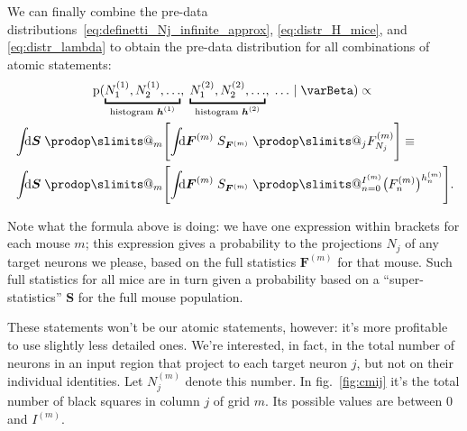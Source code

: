 \documentclass[\ifafour a4paper,12pt,\else a5paper,10pt,\fi%
onecolumn,oneside,article,%
british%
]{memoir}
\makeatletter
\theoremstyle{remark}
\theoremstyle{innote}
\def\prod{\DOTSI\prodop\slimits@}
\newcommand*{\di}{\mathrm{d}}%
\newcommand*{\pf}{\mathrm{p}}%
\renewcommand*{\|}[1][]{\nonscript\,#1\vert\nonscript\;\mathopen{}}
\newcommand*{\fig}{fig.}%
\newcommand*{\yI}{\varBeta}
\newcommand*{\yF}{\bm{F}}
\newcommand*{\yFm}[1][m]{\yF^{(#1)}}
\newcommand*{\yFFm}[1][m]{F^{(#1)}}
\newcommand*{\yh}{\bm{h}}
\newcommand*{\yhm}[1][m]{\yh^{(#1)}}
\newcommand*{\yIm}[1][m]{I^{(#1)}}
\newcommand*{\yNm}[1][m]{N^{(#1)}}
\newcommand*{\ySS}{S}
\newcommand*{\yS}{\bm{\ySS}}
\makeatother
\begin{document}
We can finally combine the pre-data
distributions~\eqref{eq:definetti_Nj_infinite_approx},
\eqref{eq:distr_H_mice}, and \eqref{eq:distr_lambda} to obtain the pre-data
distribution for all combinations of  atomic statements:
\begin{multline}
  \label{eq:pre-data_final}
  \pf(\underbracket{\yNm[1]_{1},\yNm[1]_{2},\dotsc}_{\text{histogram $\yhm[1]$}},\;
  \underbracket{\yNm[2]_{1},\yNm[2]_{2},\dotsc}_{\text{histogram $\yhm[2]$}},\;
  \dotsc   \| \yI)
  \propto{}\\
  \begin{aligned}
  &\int\!\!\!\di\yS\;\prod_{m}\Biggl[\int\!\!\!\di\yFm\;
  \ySS_{\yFm} \;
  \prod_{j} \yFFm_{N_{j}}
  \Biggr]
\equiv{}\\
  &\int\!\!\!\di\yS\;\prod_{m}\Biggl[\int\!\!\!\di\yFm\;
  \ySS_{\yFm} \;
  \prod_{n=0}^{\yIm} \bigl(\yFFm_{n}\bigr)^{h^{(m)}_{n}}
  \Biggr].
  \end{aligned}
\end{multline}

Note what the formula above is doing: we have one expression within
brackets for each mouse $m$; this expression gives a probability to the
projections $N_{j}$ of any target neurons we please, based on the full
statistics $\yFm$ for that mouse. Such full statistics for all mice are in
turn given a probability based on a \enquote{super-statistics} $\yS$ for
the full mouse population.







These statements won't be our atomic statements, however: it's more
profitable to use slightly less detailed ones. We're interested, in fact,
in the total number of neurons in an input region that project to each
target neuron $j$, but not on their individual identities. Let $\yNm_{j}$
denote this number. In \fig~\ref{fig:cmij} it's the total number of black
squares in column $j$ of grid $m$. Its possible values are between $0$ and
$\yIm$.
\end{document}
